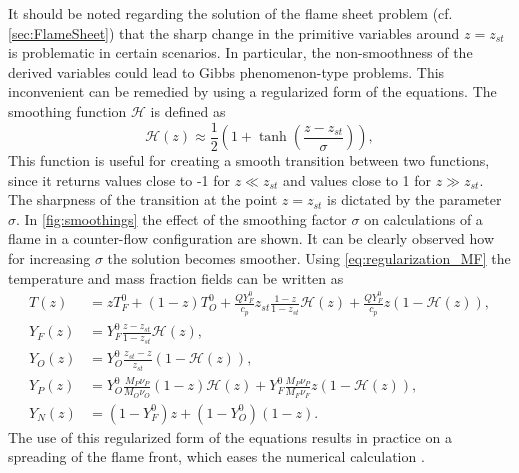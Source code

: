 It should be noted regarding the solution of the flame sheet problem (cf. \cref{sec:FlameSheet}) that the sharp change in the primitive variables around $z = z_{st}$  is problematic in certain scenarios. In particular, the non-smoothness of the derived variables could lead to Gibbs phenomenon-type problems. This inconvenient can be remedied by using a regularized form of the equations. The smoothing function $\mathcal{H}$ is defined as
\begin{equation}\label{eq:regularization_MF}
	\mathcal{H}(z) \approx \frac{1}{2}(1+\tanh(\frac{z - z_{st} }{\sigma} )),
\end{equation}
This function is useful for creating a smooth transition between two functions, since it returns values close to -1 for $z \ll z_{st}$ and values close to 1 for $z \gg z_{st}$. The sharpness of the transition at the point $z = z_{st}$   is dictated by the parameter $\sigma$. In \cref{fig:smoothings} the effect of the smoothing factor $\sigma$ on calculations of a flame in a counter-flow configuration are shown. It can be clearly observed how for increasing $\sigma$ the solution becomes smoother. Using \cref{eq:regularization_MF} the temperature and mass fraction fields can be written as
\begin{subequations}
	\begin{align}
		T(z)   & = z T_F^0 + (1-z)T_O^0 + \frac{Q Y_F^0}{c_p} z_{st}\frac{1- z}{1-z_{st}}\mathcal{H}(z) +  \frac{Q Y_F^0}{c_p}z\left(1-\mathcal{H}(z)\right),  \label{eq:BS-TR} \\[1ex]
		Y_F(z) & = Y_F^0\frac{z - z_{st}}{1-z_{st}} \mathcal{H}(z), \label{eq:BS-YFR}                                                                                           \\[1ex]
		Y_O(z) & = Y_O^0 \frac{z_{st}-z}{z_{st}} (1-\mathcal{H}(z)), \label{eq:BS-YOR}                                                                                          \\[1ex]
		Y_P(z) & =  Y_O^0\frac{M_P\nu_P}{M_O\nu_O}(1-z)\mathcal{H}(z) +	Y_F^0\frac{M_P\nu_P}{M_F\nu_F}z (1-\mathcal{H}(z)), \label{eq:BS-YPR}                                   \\[1ex]
		Y_N(z) & = (1-Y_F^0)z + (1-Y_O^0)(1-z). \label{eq:BS-YNR}
	\end{align}
\end{subequations}
The use of this regularized form of the equations results in practice on a spreading of the flame front, which eases the numerical calculation \citep{braackAdaptiveFiniteElement1997}.

